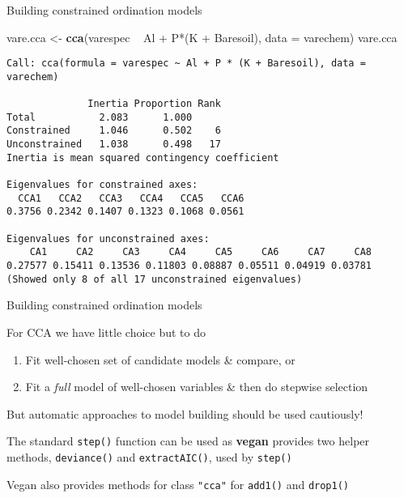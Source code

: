 \documentclass[10pt,ignorenonframetext,compress, aspectratio=169]{beamer}
\newenvironment{Shaded}{\begin{snugshade}}{\end{snugshade}}
\newcommand{\KeywordTok}[1]{\textcolor[rgb]{0.13,0.29,0.53}{\textbf{{#1}}}}
\newcommand{\DataTypeTok}[1]{\textcolor[rgb]{0.13,0.29,0.53}{{#1}}}
\newcommand{\StringTok}[1]{\textcolor[rgb]{0.31,0.60,0.02}{{#1}}}
\newcommand{\NormalTok}[1]{{#1}}
\begin{document}
\begin{frame}[fragile]{Building constrained ordination models}

\scriptsize

\begin{Shaded}
\begin{Highlighting}[]
\NormalTok{vare.cca <-}\StringTok{ }\KeywordTok{cca}\NormalTok{(varespec ~}\StringTok{ }\NormalTok{Al +}\StringTok{ }\NormalTok{P*(K +}\StringTok{ }\NormalTok{Baresoil), }\DataTypeTok{data =} \NormalTok{varechem)}
\NormalTok{vare.cca}
\end{Highlighting}
\end{Shaded}

\begin{verbatim}
Call: cca(formula = varespec ~ Al + P * (K + Baresoil), data =
varechem)

              Inertia Proportion Rank
Total           2.083      1.000     
Constrained     1.046      0.502    6
Unconstrained   1.038      0.498   17
Inertia is mean squared contingency coefficient 

Eigenvalues for constrained axes:
  CCA1   CCA2   CCA3   CCA4   CCA5   CCA6 
0.3756 0.2342 0.1407 0.1323 0.1068 0.0561 

Eigenvalues for unconstrained axes:
    CA1     CA2     CA3     CA4     CA5     CA6     CA7     CA8 
0.27577 0.15411 0.13536 0.11803 0.08887 0.05511 0.04919 0.03781 
(Showed only 8 of all 17 unconstrained eigenvalues)
\end{verbatim}

\normalsize

\end{frame}

\begin{frame}{Building constrained ordination models}

For CCA we have little choice but to do

\begin{enumerate}
\def\labelenumi{\arabic{enumi}.}
\itemsep1pt\parskip0pt
\item
  Fit well-chosen set of candidate models \& compare, or
\item
  Fit a \emph{full} model of well-chosen variables \& then do stepwise
  selection
\end{enumerate}

But automatic approaches to model building should be used cautiously!

The standard \texttt{step()} function can be used as \textbf{vegan}
provides two helper methods, \texttt{deviance()} and
\texttt{extractAIC()}, used by \texttt{step()}

Vegan also provides methods for class \texttt{"cca"} for \texttt{add1()}
and \texttt{drop1()}

\end{frame}
\end{document}
